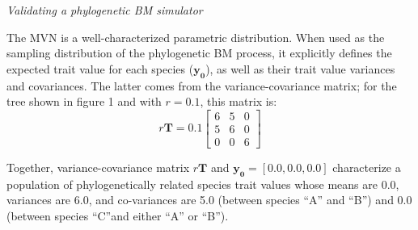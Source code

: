 \documentclass[oneside]{article}
\begin{document}
\begin{tcolorbox}[breakable, width=\textwidth, colback=gray!10, boxrule=0pt,
  title=Box 1: Models characterized by well-known parametric distributions, fonttitle=\bfseries]
\emph{Validating a phylogenetic BM simulator}

The MVN is a well-characterized parametric distribution.
When used as the sampling distribution of the phylogenetic BM
process, it explicitly defines the expected trait value for
each species ($\boldsymbol{y_0}$), as well as their trait value
variances and covariances.
The latter comes from the variance-covariance matrix; for the
tree shown in figure 1 %
and with $r = 0.1$, this matrix
is:
\begin{equation}
  r\boldsymbol{T} = 0.1
  \begin{bmatrix}
    6 & 5 & 0\\
    5 & 6 & 0\\
    0 & 0 & 6
  \end{bmatrix}
  \label{eq:mat}
\end{equation}

Together, variance-covariance matrix $r\boldsymbol{T}$ and
$\boldsymbol{y_0} = [0.0, 0.0, 0.0]$ characterize a
population of phylogenetically related species trait values
whose means are 0.0, variances are 6.0, and co-variances
are 5.0 (between species ``A'' and ``B'') and 0.0 (between
species ``C''and
either ``A'' or ``B'').

\vspace{.25cm}


\end{tcolorbox}
\end{document}
